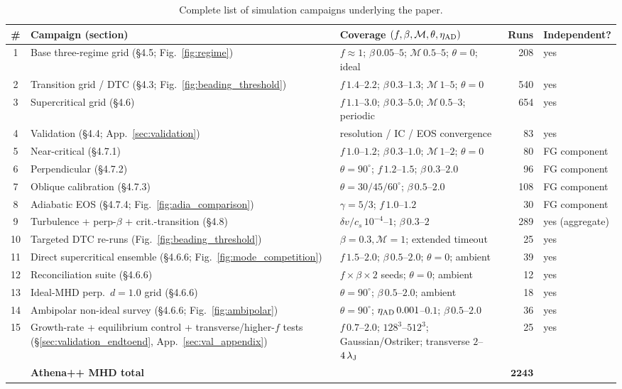 \documentclass[usenatbib,twoside,twocolumn]{mnras}
\begin{document}
\begin{table}
\caption{Complete list of simulation campaigns underlying the paper.}
\label{tab:campaigns}
\begin{tabular}{cllrl}
\toprule
\# & Campaign (section) & Coverage $(f,\beta,\mathcal{M},\theta,\eta_{\rm AD})$ & Runs & Independent? \\
\midrule
1  & Base three-regime grid (\S4.5; Fig.~\ref{fig:regime}) & $f\approx1$; $\beta\,0.05$--$5$; $\mathcal{M}\,0.5$--$5$; $\theta=0$; ideal & 208 & yes \\
2  & Transition grid / DTC (\S4.3; Fig.~\ref{fig:beading_threshold}) & $f\,1.4$--$2.2$; $\beta\,0.3$--$1.3$; $\mathcal{M}\,1$--$5$; $\theta=0$ & 540 & yes \\
3  & Supercritical grid (\S4.6) & $f\,1.1$--$3.0$; $\beta\,0.3$--$5.0$; $\mathcal{M}\,0.5$--$3$; periodic & 654 & yes \\
4  & Validation (\S4.4; App.~\ref{sec:validation}) & resolution / IC / EOS convergence & 83 & yes \\
5  & Near-critical (\S4.7.1) & $f\,1.0$--$1.2$; $\beta\,0.3$--$1.0$; $\mathcal{M}\,1$--$2$; $\theta=0$ & 80 & FG component \\
6  & Perpendicular (\S4.7.2) & $\theta=90^\circ$; $f\,1.2$--$1.5$; $\beta\,0.3$--$2.0$ & 96 & FG component \\
7  & Oblique calibration (\S4.7.3) & $\theta=30/45/60^\circ$; $\beta\,0.5$--$2.0$ & 108 & FG component \\
8  & Adiabatic EOS (\S4.7.4; Fig.~\ref{fig:adia_comparison}) & $\gamma=5/3$; $f\,1.0$--$1.2$ & 30 & FG component \\
9  & Turbulence + perp-$\beta$ + crit.-transition (\S4.8) & $\delta v/c_s\,10^{-4}$--$1$; $\beta\,0.3$--$2$ & 289 & yes (aggregate) \\
10 & Targeted DTC re-runs (Fig.~\ref{fig:beading_threshold}) & $\beta=0.3,\mathcal{M}=1$; extended timeout & 25 & yes \\
11 & Direct supercritical ensemble (\S4.6.6; Fig.~\ref{fig:mode_competition}) & $f\,1.5$--$2.0$; $\beta\,0.5$--$2.0$; $\theta=0$; ambient & 39 & yes \\
12 & Reconciliation suite (\S4.6.6) & $f\times\beta\times2$ seeds; $\theta=0$; ambient & 12 & yes \\
13 & Ideal-MHD perp.\ $d=1.0$ grid (\S4.6.6) & $\theta=90^\circ$; $\beta\,0.5$--$2.0$; ambient & 18 & yes \\
14 & Ambipolar non-ideal survey (\S4.6.6; Fig.~\ref{fig:ambipolar}) & $\theta=90^\circ$; $\eta_{\rm AD}\,0.001$--$0.1$; $\beta\,0.5$--$2.0$ & 36 & yes \\
15 & Growth-rate + equilibrium control + transverse/higher-$f$ tests (\S\ref{sec:validation_endtoend}, App.~\ref{sec:val_appendix}) & $f\,0.7$--$2.0$; $128^3$--$512^3$; Gaussian/Ostriker; transverse $2$--$4\,\lambda_{\rm J}$ & 25 & yes \\
\midrule
   & \textbf{Athena++ MHD total} & & $\boldsymbol{2243}$ & \\
\bottomrule
\end{tabular}
\end{table}
\end{document}
